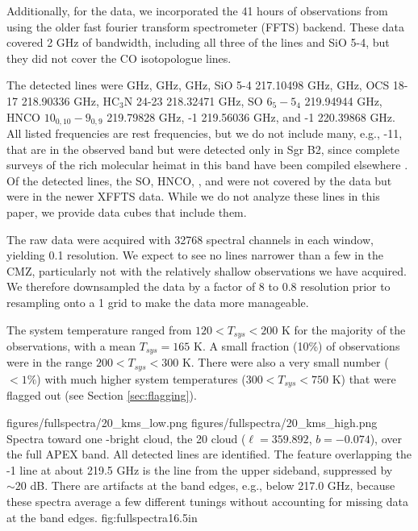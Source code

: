 Additionally, for the \para data, we incorporated the 41 hours of observations
from \citet{Ao2013a} using the older fast fourier transform spectrometer (FFTS)
backend.  These data covered 2 GHz of bandwidth, including all three of the
\para lines and SiO 5-4, but they did not cover the CO isotopologue lines.

The detected lines were \para {} GHz, \para {} GHz, \para {} GHz, SiO 5-4 217.10498 GHz,
\methanol {} GHz, OCS 18-17 218.90336 GHz, HC$_3$N 24-23
218.32471 GHz, SO $6_5-5_4$ 219.94944 GHz, HNCO $10_{0,10}-9_{0,9}$ 219.79828
GHz, -1 219.56036 GHz, and -1 220.39868 GHz.  All
listed frequencies are rest frequencies, but we do not include many, e.g.,
-11, that are in the observed band but were detected only in
Sgr B2, since complete surveys of the rich molecular heimat in this band have
been compiled elsewhere \citep{Nummelin1998a, Belloche2013a}.  Of the detected
lines, the SO, HNCO, \ceighteeno, and \thirteenco were not covered by the
\citet{Ao2013a} data but were in the newer XFFTS data.  While we do
not analyze these lines in this paper, we provide data cubes that include
them.


The raw data were acquired with 32768 spectral channels in each window,
yielding 0.1 \kms resolution.  We expect to see no lines narrower than a few
\kms in the CMZ, particularly not with the relatively shallow observations we
have acquired.  We therefore downsampled the data by a factor of 8 to 0.8 \kms
resolution prior to resampling onto a 1 \kms grid to make the data more
manageable.  

The system temperature ranged from $120 < T_{sys} < 200$ K for the majority of
the observations, with a mean $T_{sys}=165$ K.  A small fraction (10\%) of
observations were in the range $200 < T_{sys} < 300$ K.  There were also a very
small number ($<1\%$) with much higher system temperatures ($300 < T_{sys} <
750$ K) that were flagged out (see Section \ref{sec:flagging}).

\FigureTwoAA
{figures/fullspectra/20_kms_low.png}
{figures/fullspectra/20_kms_high.png}
{Spectra toward one \formaldehyde-bright cloud, the 20 \kms cloud
($\ell=359.892$, $b=-0.074$), over the full APEX band.  All detected lines are
identified.  The feature overlapping the -1
line at about 219.5 GHz is the \twelveco line from the upper sideband,
suppressed by $\sim20$ dB.
There are artifacts at the band edges, e.g., below 217.0 GHz, because these
spectra average a few different tunings without accounting for missing data at
the band edges.}
{fig:fullspectra}{1}{6.5in}

